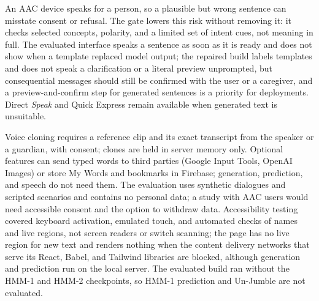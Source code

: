 An AAC device speaks for a person, so a plausible but wrong sentence can misstate consent or refusal.
The gate lowers this risk without removing it: it checks selected concepts, polarity, and a limited set of intent cues, not meaning in full.
The evaluated interface speaks a sentence as soon as it is ready and does not show when a template replaced model output; the repaired build labels templates and does not speak a clarification or a literal preview unprompted, but consequential messages should still be confirmed with the user or a caregiver, and a preview-and-confirm step for generated sentences is a priority for deployments.
Direct \emph{Speak} and Quick Express remain available when generated text is unsuitable.

Voice cloning requires a reference clip and its exact transcript from the speaker or a guardian, with consent; clones are held in server memory only.
Optional features can send typed words to third parties (Google Input Tools, OpenAI Images) or store My Words and bookmarks in Firebase; generation, prediction, and speech do not need them.
The evaluation uses synthetic dialogues and scripted scenarios and contains no personal data; a study with AAC users would need accessible consent and the option to withdraw data.
Accessibility testing covered keyboard activation, emulated touch, and automated checks of names and live regions, not screen readers or switch scanning; the page has no live region for new text and renders nothing when the content delivery networks that serve its React, Babel, and Tailwind libraries are blocked, although generation and prediction run on the local server.
The evaluated build ran without the HMM-1 and HMM-2 checkpoints, so HMM-1 prediction and Un-Jumble are not evaluated.
